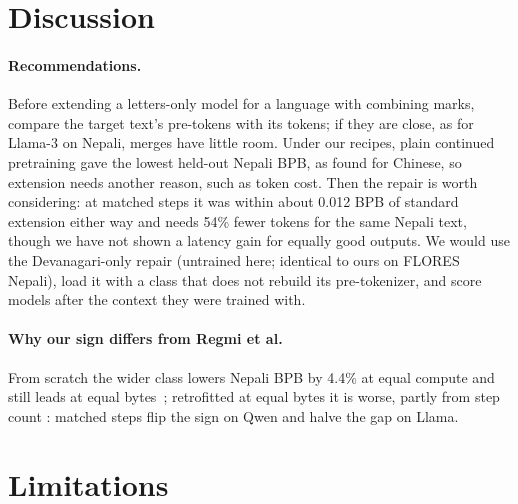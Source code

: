 \section{Discussion}
\label{sec:discussion}

\paragraph{Recommendations.} Before extending a letters-only model for a language with combining marks, compare the target text's pre-tokens with its tokens; if they are close, as for Llama-3 on Nepali, merges have little room. Under our recipes, plain continued pretraining gave the lowest held-out Nepali BPB, as \citet{zhao2024llamabeyond} found for Chinese, so extension needs another reason, such as token cost. Then the repair is worth considering: at matched steps it was within about 0.012 BPB of standard extension either way and needs 54\% fewer tokens for the same Nepali text, though we have not shown a latency gain for equally good outputs. We would use the Devanagari-only repair (untrained here; identical to ours on FLORES Nepali), load it with a class that does not rebuild its pre-tokenizer, and score models after the context they were trained with.

\paragraph{Why our sign differs from Regmi et al.} From scratch the wider class lowers Nepali BPB by 4.4\% at equal compute and still leads at equal bytes~\citep{regmi2026vowel}; retrofitted at equal bytes it is worse, partly from step count \citep[cf.][]{shrestha2026papaya}: matched steps flip the sign on Qwen and halve the gap on Llama.

\section*{Limitations}

